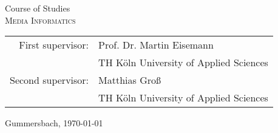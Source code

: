 \begin{titlepage}
\begin{center}
		\vspace{0.4cm}
		
		\begin{large}
			Course of Studies\\ 
			\vspace{0.2cm}
			\textsc{Media Informatics}
		\end{large}
		
		\vspace{1.0cm}
		
		\begin{tabular}{rl}
			First supervisor: 	& Prof. Dr. Martin Eisemann\\
						& \small TH Köln University of Applied Sciences\\[1.0em]
			Second supervisor: 	& Matthias Groß\\
						& \small TH Köln University of Applied Sciences
		\end{tabular}
		
		\vspace{0.6cm}
		
		\begin{large}
			Gummersbach, \today
		\end{large}
	\end{center}
		

\end{titlepage}